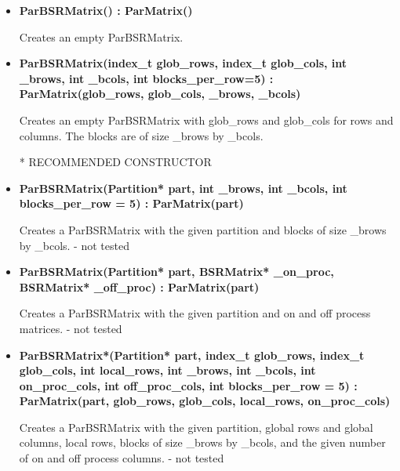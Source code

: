 \documentclass{article}
\begin{document}
\begin{itemize}
    \item \textbf{ParBSRMatrix() : ParMatrix()}
    
        Creates an empty ParBSRMatrix.
    
    \item \textbf{ParBSRMatrix(index\_t glob\_rows, index\_t glob\_cols, 
                    int \_brows, int \_bcols, int blocks\_per\_row=5) :
                    ParMatrix(glob\_rows, glob\_cols, \_brows, \_bcols)}
                    
        Creates an empty ParBSRMatrix with glob\_rows and glob\_cols for
        rows and columns. The blocks are of size \_brows by \_bcols.
                    
        * RECOMMENDED CONSTRUCTOR
                    
    \item \textbf{ParBSRMatrix(Partition* part, int \_brows, int \_bcols, 
                    int blocks\_per\_row = 5) : ParMatrix(part)}
                    
        Creates a ParBSRMatrix with the given partition and blocks of size
        \_brows by \_bcols. - not tested
                    
    \item \textbf{ParBSRMatrix(Partition* part, BSRMatrix* \_on\_proc, 
                    BSRMatrix* \_off\_proc) : ParMatrix(part)}
                    
        Creates a ParBSRMatrix with the given partition and on and off
        process matrices. - not tested
                    
    \item \textbf{ParBSRMatrix*(Partition* part, index\_t glob\_rows, index\_t glob\_cols,
                    int local\_rows, int \_brows, int \_bcols, int on\_proc\_cols,
                    int off\_proc\_cols, int blocks\_per\_row = 5) : 
                    ParMatrix(part, glob\_rows, glob\_cols, local\_rows, on\_proc\_cols)}
                    
        Creates a ParBSRMatrix with the given partition, global rows and global columns,
        local rows, blocks of size \_brows by \_bcols, and the given number of
        on and off process columns. - not tested
\end{itemize}
\end{document}
